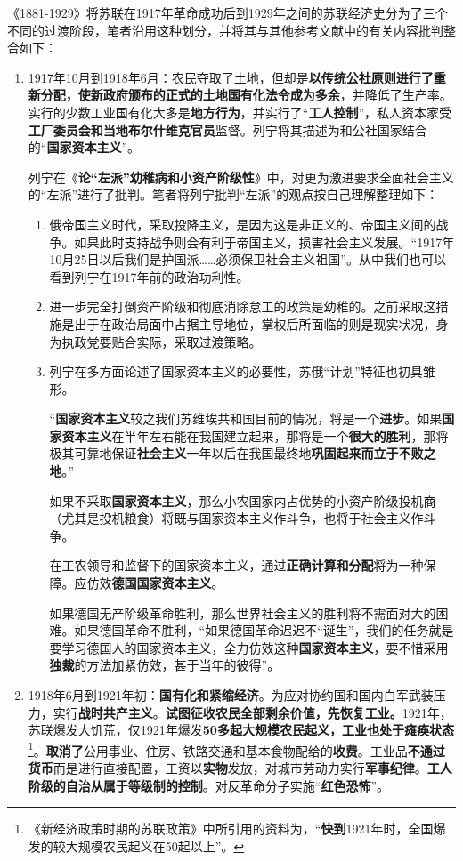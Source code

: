 《1881-1929》将苏联在1917年革命成功后到1929年之间的苏联经济史分为了三个不同的过渡阶段，笔者沿用这种划分，并将其与其他参考文献中的有关内容批判整合如下：
\begin{enumerate}
\item 1917年10月到1918年6月：农民夺取了土地，但却是\textbf{以传统公社原则进行了重新分配，使新政府颁布的正式的土地国有化法令成为多余}，并降低了生产率。实行的少数工业国有化大多是\textbf{地方行为}，并实行了“\textbf{工人控制}”，私人资本家受\textbf{工厂委员会和当地布尔什维克官员}监督。列宁将其描述为和公社国家结合的“\textbf{国家资本主义}”。

  列宁在《\textbf{论“左派”幼稚病和小资产阶级性}》中，对更为激进要求全面社会主义的“左派”进行了批判。笔者将列宁批判“左派”的观点按自己理解整理如下：
  \begin{enumerate}
  \item 俄帝国主义时代，采取投降主义，是因为这是非正义的、帝国主义间的战争。如果此时支持战争则会有利于帝国主义，损害社会主义发展。“1917年10月25日以后我们是护国派……必须保卫社会主义祖国”。从中我们也可以看到列宁在1917年前的政治功利性。

  \item 进一步完全打倒资产阶级和彻底消除怠工的政策是幼稚的。之前采取这措施是出于在政治局面中占据主导地位，掌权后所面临的则是现实状况，身为执政党要贴合实际，采取过渡策略。

  \item 列宁在多方面论述了国家资本主义的必要性，苏俄“计划”特征也初具雏形。

    “\textbf{国家资本主义}较之我们苏维埃共和国目前的情况，将是一个\textbf{进步}。如果\textbf{国家资本主义}在半年左右能在我国建立起来，那将是一个\textbf{很大的胜利}，那将极其可靠地保证\textbf{社会主义}一年以后在我国最终地\textbf{巩固起来而立于不败之地}。”

    如果不采取\textbf{国家资本主义}，那么小农国家内占优势的小资产阶级投机商（尤其是投机粮食）将既与国家资本主义作斗争，也将于社会主义作斗争。

    在工农领导和监督下的国家资本主义，通过\textbf{正确计算和分配}将为一种保障。应仿效\textbf{德国国家资本主义}。

    如果德国无产阶级革命胜利，那么世界社会主义的胜利将不需面对大的困难。如果德国革命不胜利，“如果德国革命迟迟不“诞生”，我们的任务就是要学习德国人的国家资本主义，全力仿效这种\textbf{国家资本主义}，要不惜采用\textbf{独裁}的方法加紧仿效，甚于当年的彼得”。
  \end{enumerate}

\item 1918年6月到1921年初：\textbf{国有化和紧缩经济}。为应对协约国和国内白军武装压力，实行\textbf{战时共产主义}。\textbf{试图征收农民全部剩余价值，先恢复工业。}1921年，苏联爆发大饥荒，仅1921年爆发\textbf{50多起大规模农民起义，工业也处于瘫痪状态}\footnote{《新经济政策时期的苏联政策》中所引用的资料为，“\textbf{快到}1921年时，全国爆发的较大规模农民起义在50起以上”。}。\textbf{取消了}公用事业、住房、铁路交通和基本食物配给的\textbf{收费}。工业品\textbf{不通过货币}而是进行直接配置，工资以\textbf{实物}发放，对城市劳动力实行\textbf{军事纪律}。\textbf{工人阶级的自治从属于等级制的控制}。对反革命分子实施“\textbf{红色恐怖}”。


\end{enumerate}
